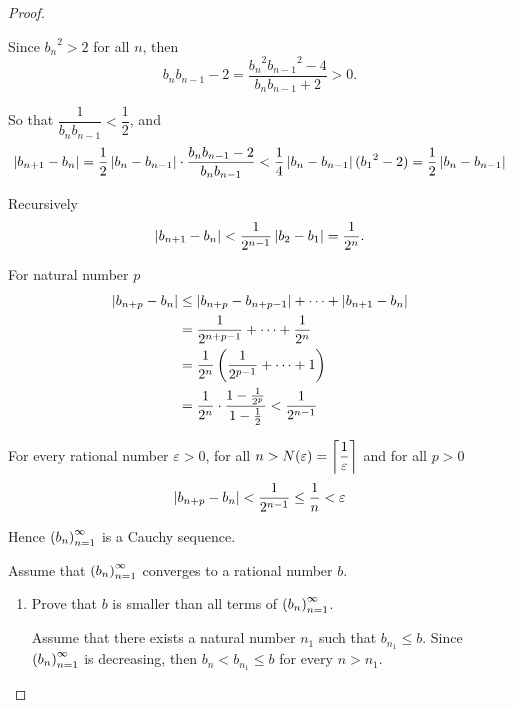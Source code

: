 \begin{proof}
\begin{enumerate}[label={\textbf{Step \arabic*.}},itemindent=1cm]
              Since ${b_{n}}^{2} > 2$ for all $n$, then
              \[
                  b_{n}b_{n-1} - 2 = \frac{{b_{n}}^{2}{b_{n-1}}^{2} - 4}{b_{n}b_{n-1} + 2} > 0.
              \]

              So that $\dfrac{1}{b_{n}b_{n-1}} < \dfrac{1}{2}$, and
              \[
                  \left\vert{b_{n+1} - b_{n}}\right\vert = \frac{1}{2}\left\vert{b_{n} - b_{n-1}}\right\vert\cdot\frac{b_{n}b_{n-1} - 2}{b_{n}b_{n-1}} < \frac{1}{4}\left\vert{b_{n} - b_{n-1}}\right\vert({b_{1}}^{2} - 2) = \frac{1}{2}\left\vert{b_{n} - b_{n-1}}\right\vert
              \]

              Recursively
              \[
                  \left\vert{b_{n+1} - b_{n}}\right\vert < \frac{1}{{2}^{n-1}}\left\vert{b_{2} - b_{1}}\right\vert = \frac{1}{2^{n}}.
              \]

              For natural number $p$
              \begin{align*}
                  \left\vert{b_{n+p} - b_{n}}\right\vert & \le \left\vert{b_{n+p} - b_{n+p-1}}\right\vert + \cdots + \left\vert{b_{n+1} - b_{n}}\right\vert                              \\
                                        & = \frac{1}{{2}^{n+p-1}} + \cdots + \frac{1}{{2}^{n}}                                        \\
                                        & = \frac{1}{{2}^{n}}\left( \frac{1}{{2}^{p-1}} + \cdots + 1 \right)                          \\
                                        & = \frac{1}{{2}^{n}}\cdot\frac{1 - \frac{1}{{2}^{p}}}{1 - \frac{1}{2}} < \frac{1}{{2}^{n-1}}
              \end{align*}

              For every rational number $\varepsilon > 0$, for all $n > N(\varepsilon) = \left\lceil{\dfrac{1}{\varepsilon}}\right\rceil$ and for all $p > 0$
              \[
                  \left\vert{b_{n+p} - b_{n}}\right\vert < \frac{1}{{2}^{n-1}} \le \frac{1}{n} < \varepsilon
              \]

              Hence ${\left({b_{n}}\right)}^{\infty}_{n=1}$ is a Cauchy sequence.
    \end{enumerate}

    \bigskip
    Assume that ${\left({b_{n}}\right)}^{\infty}_{n=1}$ converges to a rational number $b$.

    \begin{enumerate}[label={\textbf{Step \arabic*.}},start=4,itemindent=1cm]
        \item Prove that $b$ is smaller than all terms of ${\left({b_{n}}\right)}^{\infty}_{n=1}$.

              Assume that there exists a natural number $n_{1}$ such that $b_{n_{1}}\le b$. Since ${\left({b_{n}}\right)}^{\infty}_{n=1}$ is decreasing, then $b_{n} < b_{n_{1}}\le b$ for every $n > n_{1}$.


\end{enumerate}
\end{proof}
